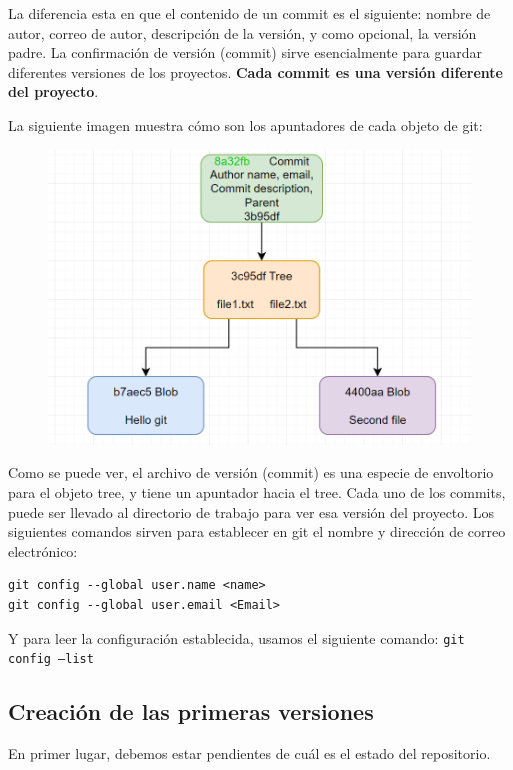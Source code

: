 La diferencia esta en que el contenido de un commit es el siguiente: nombre de autor, correo de autor, descripción de la versión, y como opcional, la versión padre. La confirmación de versión (commit) sirve esencialmente para guardar diferentes versiones de los proyectos. \textbf{Cada commit es una versión diferente del proyecto}.

La siguiente imagen muestra cómo son los apuntadores de cada objeto de git:

\begin{figure}[H]
    \centering
    \includegraphics[scale=0.5]{Github/Git_f4.png}
\end{figure}

Como se puede ver, el archivo de versión (commit) es una especie de envoltorio para el objeto tree, y tiene un apuntador hacia el tree. Cada uno de los commits, puede ser llevado al directorio de trabajo para ver esa versión del proyecto. Los siguientes comandos sirven para establecer en git el nombre y dirección de correo electrónico:

\begin{verbatim}
git config --global user.name <name>
git config --global user.email <Email> 
\end{verbatim}

Y para leer la configuración establecida, usamos el siguiente comando: \texttt{git config --list}

\subsection{Creación de las primeras versiones}

En primer lugar, debemos estar pendientes de cuál es el estado del repositorio.

